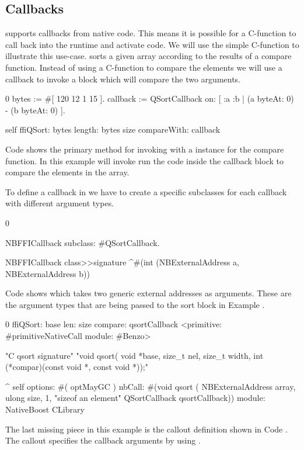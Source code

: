 \subsection{Callbacks}

\NB supports callbacks from native code.
This means it is possible for a C-function to call back into the \PH runtime and activate code.
We will use the simple  C-function to illustrate this use-case.
 sorts a given array according to the results of a compare function.
Instead of using a C-function to compare the elements we will use a callback to invoke a \PH block which will compare the two arguments.
%
\begin{stcode}[
	label={lst:ffi-calloutWithCallback},
	caption={Example of callout passing a callback for \ttt{qsort}}]{0}
bytes := #[ 120 12 1 15 ].
callback := QSortCallback on: [ :a :b |
				(a byteAt: 0) - (b byteAt: 0) ].

self ffiQSort: bytes
	 length: bytes size
	 compareWith: callback
\end{stcode}
%
Code  shows the primary \PH method for invoking  with a  instance for the compare function.
In this example  will invoke run the \PH code inside the callback block to compare the elements in the  array.

To define a callback in \NB we have to create a specific subclasses for each callback with different argument types.
%
\begin{stcode}[
	label={lst:ffi-callbackDefinition},
	caption={Example of callback definition}]{0}

NBFFICallback
    subclass: #QSortCallback.

NBFFICallback class>>signature
	^#(int (NBExternalAddress a, NBExternalAddress b))
\end{stcode}
%
Code  shows  which takes two generic external addresses as arguments.
These are the argument types that are being passed to the sort block in Example .
%
\begin{stcode}[
	label={lst:ffi-qsort},
	caption={Example of callout passing a callback}]{0}
ffiQSort: base len: size compare: qsortCallback
	<primitive: #primitiveNativeCall module: #Benzo>

	"C qsort signature"
	"void qsort(
		void *base,
		size_t nel,
		size_t width,
		int (*compar)(const void *, const void *));"

	^ self
		options: #( optMayGC )
		nbCall: #(void qsort (
					NBExternalAddress array,
					ulong size,
					1, "sizeof an element"
					QSortCallback qsortCallback))
		module: NativeBoost CLibrary
\end{stcode}
%
The last missing piece in this example is the callout definition shown in Code .
The \NB callout specifies the callback arguments by using .

